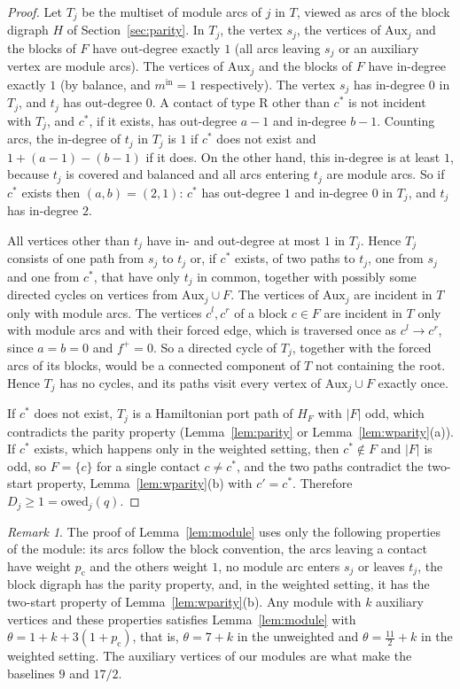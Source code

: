 \documentclass[11pt]{amsart}
\theoremstyle{definition}
\theoremstyle{remark}
\newtheorem{remark}[theorem]{Remark}
\numberwithin{equation}{section}
\newcommand{\owed}{\mathrm{owed}}
\newcommand{\Aux}{\mathrm{Aux}}
\newcommand{\pc}{p_{\mathrm{c}}}
\begin{document}
\begin{proof}
Let $T_j$ be the multiset of module arcs of $j$ in $T$, viewed as arcs of the block digraph $H$ of Section~\ref{sec:parity}. In $T_j$, the vertex $s_j$, the vertices of $\Aux_j$ and the blocks of $F$ have out-degree exactly $1$ (all arcs leaving $s_j$ or an auxiliary vertex are module arcs). The vertices of $\Aux_j$ and the blocks of $F$ have in-degree exactly $1$ (by balance, and $m^{\mathrm{in}}=1$ respectively). The vertex $s_j$ has in-degree $0$ in $T_j$, and $t_j$ has out-degree $0$. A contact of type R other than $c^*$ is not incident with $T_j$, and $c^*$, if it exists, has out-degree $a-1$ and in-degree $b-1$. Counting arcs, the in-degree of $t_j$ in $T_j$ is $1$ if $c^*$ does not exist and $1+(a-1)-(b-1)$ if it does. On the other hand, this in-degree is at least $1$, because $t_j$ is covered and balanced and all arcs entering $t_j$ are module arcs. So if $c^*$ exists then $(a,b)=(2,1)$: $c^*$ has out-degree $1$ and in-degree $0$ in $T_j$, and $t_j$ has in-degree $2$.

All vertices other than $t_j$ have in- and out-degree at most $1$ in $T_j$. Hence $T_j$ consists of one path from $s_j$ to $t_j$ or, if $c^*$ exists, of two paths to $t_j$, one from $s_j$ and one from $c^*$, that have only $t_j$ in common, together with possibly some directed cycles on vertices from $\Aux_j\cup F$. The vertices of $\Aux_j$ are incident in $T$ only with module arcs. The vertices $c^l,c^r$ of a block $c\in F$ are incident in $T$ only with module arcs and with their forced edge, which is traversed once as $c^l\to c^r$, since $a=b=0$ and $f^+=0$. So a directed cycle of $T_j$, together with the forced arcs of its blocks, would be a connected component of $T$ not containing the root. Hence $T_j$ has no cycles, and its paths visit every vertex of $\Aux_j\cup F$ exactly once.

If $c^*$ does not exist, $T_j$ is a Hamiltonian port path of $H_F$ with $|F|$ odd, which contradicts the parity property (Lemma~\ref{lem:parity} or Lemma~\ref{lem:wparity}(a)). If $c^*$ exists, which happens only in the weighted setting, then $c^*\notin F$ and $|F|$ is odd, so $F=\{c\}$ for a single contact $c\ne c^*$, and the two paths contradict the two-start property, Lemma~\ref{lem:wparity}(b) with $c'=c^*$. Therefore $D_j\ge1=\owed_j(q)$.
\end{proof}

\begin{remark}\label{rem:general}
The proof of Lemma~\ref{lem:module} uses only the following properties of the module: its arcs follow the block convention, the arcs leaving a contact have weight $\pc$ and the others weight $1$, no module arc enters $s_j$ or leaves $t_j$, the block digraph has the parity property, and, in the weighted setting, it has the two-start property of Lemma~\ref{lem:wparity}(b). Any module with $k$ auxiliary vertices and these properties satisfies Lemma~\ref{lem:module} with $\theta=1+k+3(1+\pc)$, that is, $\theta=7+k$ in the unweighted and $\theta=\frac{11}{2}+k$ in the weighted setting. The auxiliary vertices of our modules are what make the baselines $9$ and $17/2$.
\end{remark}
\end{document}
